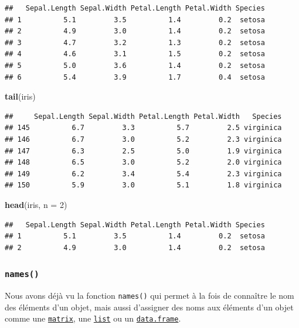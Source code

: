\documentclass[
]{book}
\newenvironment{Shaded}{\begin{snugshade}}{\end{snugshade}}
\newcommand{\DataTypeTok}[1]{\textcolor[rgb]{0.13,0.29,0.53}{#1}}
\newcommand{\DecValTok}[1]{\textcolor[rgb]{0.00,0.00,0.81}{#1}}
\newcommand{\KeywordTok}[1]{\textcolor[rgb]{0.13,0.29,0.53}{\textbf{#1}}}
\newcommand{\NormalTok}[1]{#1}
\begin{document}
\begin{verbatim}
##   Sepal.Length Sepal.Width Petal.Length Petal.Width Species
## 1          5.1         3.5          1.4         0.2  setosa
## 2          4.9         3.0          1.4         0.2  setosa
## 3          4.7         3.2          1.3         0.2  setosa
## 4          4.6         3.1          1.5         0.2  setosa
## 5          5.0         3.6          1.4         0.2  setosa
## 6          5.4         3.9          1.7         0.4  setosa
\end{verbatim}

\begin{Shaded}
\begin{Highlighting}[]
\KeywordTok{tail}\NormalTok{(iris)}
\end{Highlighting}
\end{Shaded}

\begin{verbatim}
##     Sepal.Length Sepal.Width Petal.Length Petal.Width   Species
## 145          6.7         3.3          5.7         2.5 virginica
## 146          6.7         3.0          5.2         2.3 virginica
## 147          6.3         2.5          5.0         1.9 virginica
## 148          6.5         3.0          5.2         2.0 virginica
## 149          6.2         3.4          5.4         2.3 virginica
## 150          5.9         3.0          5.1         1.8 virginica
\end{verbatim}

\begin{Shaded}
\begin{Highlighting}[]
\KeywordTok{head}\NormalTok{(iris, }\DataTypeTok{n =} \DecValTok{2}\NormalTok{)}
\end{Highlighting}
\end{Shaded}

\begin{verbatim}
##   Sepal.Length Sepal.Width Petal.Length Petal.Width Species
## 1          5.1         3.5          1.4         0.2  setosa
## 2          4.9         3.0          1.4         0.2  setosa
\end{verbatim}

\hypertarget{l015names}{%
\subsubsection{\texorpdfstring{\texttt{names()}}{names()}}\label{l015names}}

Nous avons déjà vu la fonction \texttt{names()} qui permet à la fois de connaître le nom des éléments d'un objet, mais aussi d'assigner des noms aux éléments d'un objet comme une \protect\hyperlink{l014matrix}{\texttt{matrix}}, une \protect\hyperlink{l014list}{\texttt{list}} ou un \protect\hyperlink{l014dataframe}{\texttt{data.frame}}.
\end{document}
